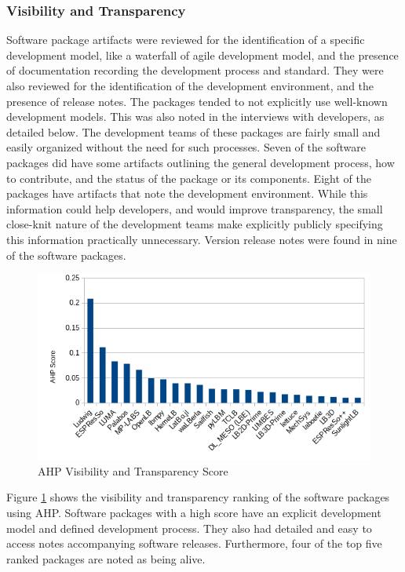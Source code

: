 \documentclass[12pt, notitlepage]{article}
\begin{document}
\subsubsection{Visibility and Transparency}

Software package artifacts were reviewed for the identification of a specific development model, like a waterfall of agile development model, and the presence of documentation recording the development process and standard. They were also reviewed for the identification of the development environment, and the presence of release notes. The packages tended to not explicitly use well-known development models. This was also noted in the interviews with developers, as detailed below. The development teams of these packages are fairly small and easily organized without the need for such processes. Seven of the software packages did have some artifacts outlining the general development process, how to contribute, and the status of the package or its components. Eight of the packages have artifacts that note the development environment. While this information could help developers, and would improve transparency, the small close-knit nature of the development teams make explicitly publicly specifying this information practically unnecessary. Version release notes were found in nine of the software packages.

\begin{figure}[h!]
	\begin{center}
		\includegraphics[width=1.0\textwidth]{visibilitytransparency_chart}
		\caption{AHP Visibility and Transparency Score}
		\label{Fig_VisibilityTransparency}
	\end{center}
\end{figure}

Figure \ref{Fig_VisibilityTransparency} shows the visibility and transparency ranking of the software packages using AHP. Software packages with a high score have an explicit development model and defined development process. They also 
had detailed and easy to access notes accompanying software releases. Furthermore, four of the top five ranked packages are noted as being alive.
\end{document}
